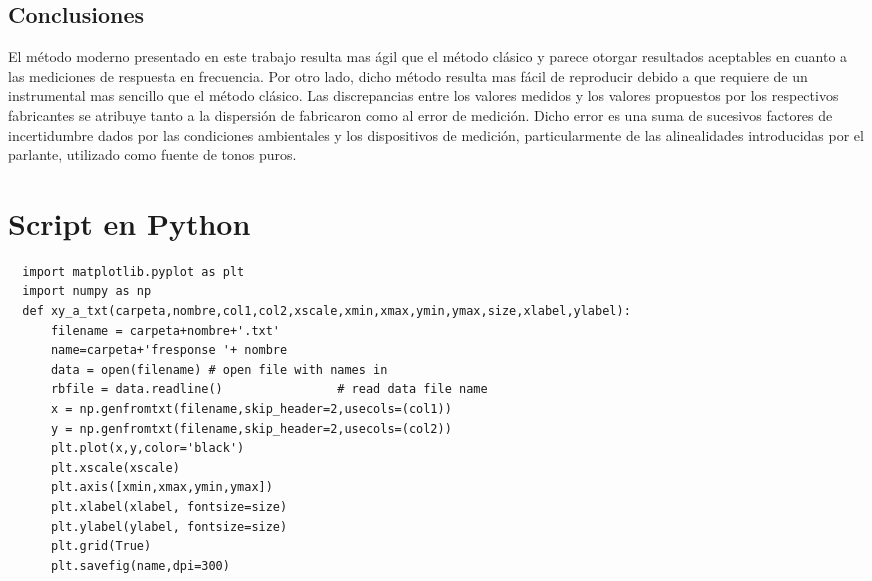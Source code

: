 \documentclass[]{article}
\begin{document}
\begin{multicols}{2}
\section{Conclusiones}
El método moderno presentado en este trabajo resulta mas ágil que el método
clásico y parece otorgar resultados aceptables en cuanto a las mediciones
de respuesta en frecuencia.
Por otro lado, dicho método resulta mas fácil de reproducir debido a que requiere
de un instrumental mas sencillo que el método clásico.
Las discrepancias entre los valores medidos y los valores propuestos por los
respectivos fabricantes se atribuye tanto a la dispersión de fabricaron como
al error de medición. Dicho error es una suma de sucesivos factores de
incertidumbre dados por las condiciones ambientales y los dispositivos de
medición, particularmente de las alinealidades introducidas por el parlante,
utilizado como fuente de tonos puros.

\printbibliography

\end{multicols}

\newpage
\appendix
\section{Script en Python}
\begin{verbatim}
  import matplotlib.pyplot as plt
  import numpy as np
  def xy_a_txt(carpeta,nombre,col1,col2,xscale,xmin,xmax,ymin,ymax,size,xlabel,ylabel):
      filename = carpeta+nombre+'.txt'
      name=carpeta+'fresponse '+ nombre
      data = open(filename) # open file with names in
      rbfile = data.readline()                # read data file name
      x = np.genfromtxt(filename,skip_header=2,usecols=(col1))
      y = np.genfromtxt(filename,skip_header=2,usecols=(col2))
      plt.plot(x,y,color='black')
      plt.xscale(xscale)
      plt.axis([xmin,xmax,ymin,ymax])
      plt.xlabel(xlabel, fontsize=size)
      plt.ylabel(ylabel, fontsize=size)
      plt.grid(True)
      plt.savefig(name,dpi=300)

\end{verbatim}
\end{document}
